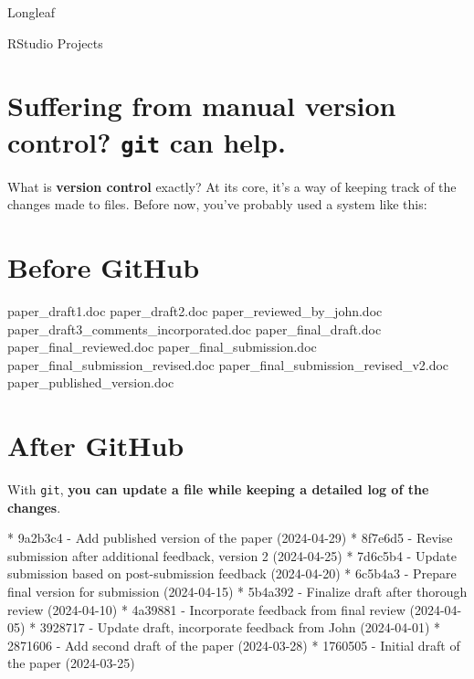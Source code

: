 \documentclass[
  letterpaper,
  DIV=11,
  numbers=noendperiod]{scrreprt}
\newenvironment{Shaded}{\begin{snugshade}}{\end{snugshade}}
\newcommand{\NormalTok}[1]{\textcolor[rgb]{0.00,0.23,0.31}{#1}}
\newcommand{\SpecialStringTok}[1]{\textcolor[rgb]{0.13,0.47,0.30}{#1}}
\begin{document}
Longleaf

RStudio Projects

\section{\texorpdfstring{Suffering from manual version control?
\texttt{git} can
help.}{Suffering from manual version control? git can help.}}\label{suffering-from-manual-version-control-git-can-help.}

What is \textbf{version control} exactly? At its core, it's a way of
keeping track of the changes made to files. Before now, you've probably
used a system like this:

\section{Before GitHub}

\begin{Shaded}
\begin{Highlighting}[]
\NormalTok{paper\_draft1.doc}
\NormalTok{paper\_draft2.doc}
\NormalTok{paper\_reviewed\_by\_john.doc}
\NormalTok{paper\_draft3\_comments\_incorporated.doc}
\NormalTok{paper\_final\_draft.doc}
\NormalTok{paper\_final\_reviewed.doc}
\NormalTok{paper\_final\_submission.doc}
\NormalTok{paper\_final\_submission\_revised.doc}
\NormalTok{paper\_final\_submission\_revised\_v2.doc}
\NormalTok{paper\_published\_version.doc}
\end{Highlighting}
\end{Shaded}

\section{After GitHub}

With \texttt{git}, \textbf{you can update a file while keeping a
detailed log of the changes}.

\begin{Shaded}
\begin{Highlighting}[]
\SpecialStringTok{* }\NormalTok{9a2b3c4 {-} Add published version of the paper (2024{-}04{-}29)}
\SpecialStringTok{* }\NormalTok{8f7e6d5 {-} Revise submission after additional feedback, version 2 (2024{-}04{-}25)}
\SpecialStringTok{* }\NormalTok{7d6c5b4 {-} Update submission based on post{-}submission feedback (2024{-}04{-}20)}
\SpecialStringTok{* }\NormalTok{6c5b4a3 {-} Prepare final version for submission (2024{-}04{-}15)}
\SpecialStringTok{* }\NormalTok{5b4a392 {-} Finalize draft after thorough review (2024{-}04{-}10)}
\SpecialStringTok{* }\NormalTok{4a39881 {-} Incorporate feedback from final review (2024{-}04{-}05)}
\SpecialStringTok{* }\NormalTok{3928717 {-} Update draft, incorporate feedback from John (2024{-}04{-}01)}
\SpecialStringTok{* }\NormalTok{2871606 {-} Add second draft of the paper (2024{-}03{-}28)}
\SpecialStringTok{* }\NormalTok{1760505 {-} Initial draft of the paper (2024{-}03{-}25)}
\end{Highlighting}
\end{Shaded}
\end{document}
